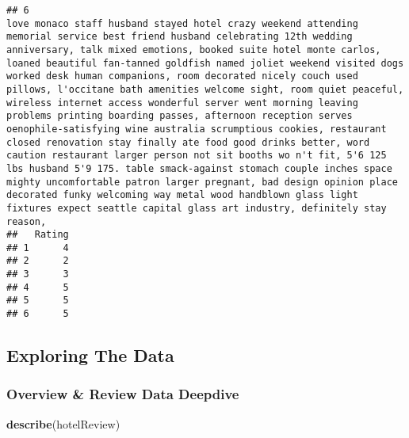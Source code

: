 \documentclass[
]{article}
\newenvironment{Shaded}{\begin{snugshade}}{\end{snugshade}}
\newcommand{\FunctionTok}[1]{\textcolor[rgb]{0.13,0.29,0.53}{\textbf{#1}}}
\newcommand{\NormalTok}[1]{#1}
\begin{document}
\begin{verbatim}
## 6                                                                                                                                                                                                                                                                                                                                                                                                                                                                                                                                                                                                                                                                                                                love monaco staff husband stayed hotel crazy weekend attending memorial service best friend husband celebrating 12th wedding anniversary, talk mixed emotions, booked suite hotel monte carlos, loaned beautiful fan-tanned goldfish named joliet weekend visited dogs worked desk human companions, room decorated nicely couch used pillows, l'occitane bath amenities welcome sight, room quiet peaceful, wireless internet access wonderful server went morning leaving problems printing boarding passes, afternoon reception serves oenophile-satisfying wine australia scrumptious cookies, restaurant closed renovation stay finally ate food good drinks better, word caution restaurant larger person not sit booths wo n't fit, 5'6 125 lbs husband 5'9 175. table smack-against stomach couple inches space mighty uncomfortable patron larger pregnant, bad design opinion place decorated funky welcoming way metal wood handblown glass light fixtures expect seattle capital glass art industry, definitely stay reason,  
##   Rating
## 1      4
## 2      2
## 3      3
## 4      5
## 5      5
## 6      5
\end{verbatim}

\hypertarget{exploring-the-data}{%
\subsection{Exploring The Data}\label{exploring-the-data}}

\hypertarget{overview-review-data-deepdive}{%
\subsubsection{Overview \& Review Data
Deepdive}\label{overview-review-data-deepdive}}

\begin{Shaded}
\begin{Highlighting}[]
\FunctionTok{describe}\NormalTok{(hotelReview)}
\end{Highlighting}
\end{Shaded}
\end{document}
